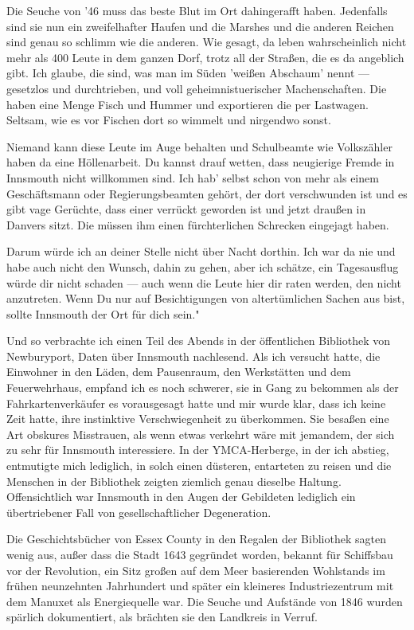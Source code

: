 Die Seuche von '46 muss das beste Blut im Ort dahingerafft haben. Jedenfalls sind sie nun ein zweifelhafter Haufen und die Marshes und die anderen Reichen sind genau so schlimm wie die anderen. Wie gesagt, da leben wahrscheinlich nicht mehr als 400 Leute in dem ganzen Dorf, trotz all der Straßen, die es da angeblich gibt. Ich glaube, die sind, was man im Süden 'weißen Abschaum' nennt --- gesetzlos und durchtrieben, und voll geheimnistuerischer Machenschaften. Die haben eine Menge Fisch und Hummer und exportieren die per Lastwagen. Seltsam, wie es vor Fischen dort so wimmelt und nirgendwo sonst.

Niemand kann diese Leute im Auge behalten und Schulbeamte wie Volkszähler haben da eine Höllenarbeit. Du kannst drauf wetten, dass neugierige Fremde in Innsmouth nicht willkommen sind. Ich hab' selbst schon von mehr als einem Geschäftsmann oder Regierungsbeamten gehört, der dort verschwunden ist und es gibt vage Gerüchte, dass einer verrückt geworden ist und jetzt draußen in Danvers sitzt. Die müssen ihm einen fürchterlichen Schrecken eingejagt haben.

Darum würde ich an deiner Stelle nicht über Nacht dorthin. Ich war da nie und habe auch nicht den Wunsch, dahin zu gehen, aber ich schätze, ein Tagesausflug würde dir nicht schaden --- auch wenn die Leute hier dir raten werden, den nicht anzutreten. Wenn Du nur auf Besichtigungen von altertümlichen Sachen aus bist, sollte Innsmouth der Ort für dich sein."

Und so verbrachte ich einen Teil des Abends in der öffentlichen Bibliothek von Newburyport, Daten über Innsmouth nachlesend. Als ich versucht hatte, die Einwohner in den Läden, dem Pausenraum, den Werkstätten und dem Feuerwehrhaus, empfand ich es noch schwerer, sie in Gang zu bekommen als der Fahrkartenverkäufer es vorausgesagt hatte und mir wurde klar, dass ich keine Zeit hatte, ihre instinktive Verschwiegenheit zu überkommen. Sie besaßen eine Art obskures Misstrauen, als wenn etwas verkehrt wäre mit jemandem, der sich zu sehr für Innsmouth interessiere. In der YMCA-Herberge, in der ich abstieg, entmutigte mich lediglich, in solch einen düsteren, entarteten zu reisen und die Menschen in der Bibliothek zeigten ziemlich genau dieselbe Haltung. Offensichtlich war Innsmouth in den Augen der Gebildeten lediglich ein übertriebener Fall von gesellschaftlicher Degeneration.

Die Geschichtsbücher von Essex County in den Regalen der Bibliothek sagten wenig aus, außer dass die Stadt 1643 gegründet worden, bekannt für Schiffsbau vor der Revolution, ein Sitz großen auf dem Meer basierenden Wohlstands im frühen neunzehnten Jahrhundert und später ein kleineres Industriezentrum mit dem Manuxet als Energiequelle war. Die Seuche und Aufstände von 1846 wurden spärlich dokumentiert, als brächten sie den Landkreis in Verruf.

